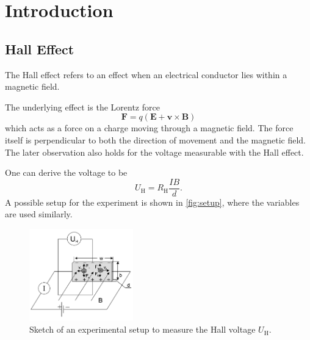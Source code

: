 \section{Introduction}
\label{sec:introduction}

\subsection{Hall Effect}
\label{sec:intr:hall}
The Hall effect refers to an effect when an electrical conductor lies within a magnetic field. 

The underlying effect is the Lorentz force
\[
  \mathbf F = q (\mathbf E + \mathbf v \times \mathbf B)
\]
which acts as a force on a charge moving through a magnetic field. The force itself is perpendicular
to both the direction of movement and the magnetic field. The later observation also holds for the
voltage measurable with the Hall effect.

One can derive the voltage to be 
\begin{equation}
  U_\text{H} = R_\text{H} \frac{I B}{d}.
\end{equation}
A possible setup for the experiment is shown in \autoref{fig:setup}, where the variables are used
similarly. 
\begin{figure}
  \centering
  \includegraphics[width=0.4\textwidth]{media/setup_sketch.png}
  \caption{Sketch of an experimental setup to measure the Hall voltage $U_\text{H}$.}
  \label{fig:setup}
\end{figure}

